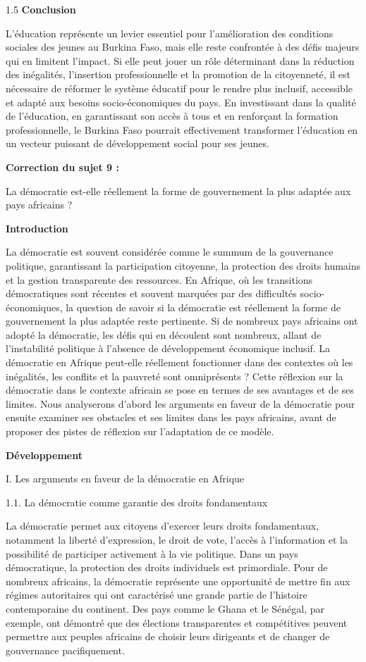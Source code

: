 \documentclass[12pt]{article}
\begin{document}
\begin{spacing}{1.5}
\textbf{Conclusion}

L'éducation représente un levier essentiel pour l'amélioration des conditions sociales des jeunes au Burkina Faso, mais elle reste confrontée à des défis majeurs qui en limitent l'impact. Si elle peut jouer un rôle déterminant dans la réduction des inégalités, l'insertion professionnelle et la promotion de la citoyenneté, il est nécessaire de réformer le système éducatif pour le rendre plus inclusif, accessible et adapté aux besoins socio-économiques du pays. En investissant dans la qualité de l'éducation, en garantissant son accès à tous et en renforçant la formation professionnelle, le Burkina Faso pourrait effectivement transformer l'éducation en un vecteur puissant de développement social pour ses jeunes.



\quad
\quad

\textbf{Correction du sujet 9 :}

 La démocratie est-elle réellement la forme de gouvernement la plus adaptée aux pays africains ?

\textbf{Introduction
}

La démocratie est souvent considérée comme le summum de la gouvernance politique, garantissant la participation citoyenne, la protection des droits humains et la gestion transparente des ressources. En Afrique, où les transitions démocratiques sont récentes et souvent marquées par des difficultés socio-économiques, la question de savoir si la démocratie est réellement la forme de gouvernement la plus adaptée reste pertinente. Si de nombreux pays africains ont adopté la démocratie, les défis qui en découlent sont nombreux, allant de l'instabilité politique à l'absence de développement économique inclusif. La démocratie en Afrique peut-elle réellement fonctionner dans des contextes où les inégalités, les conflits et la pauvreté sont omniprésents ? Cette réflexion sur la démocratie dans le contexte africain se pose en termes de ses avantages et de ses limites. Nous analyserons d'abord les arguments en faveur de la démocratie pour ensuite examiner ses obstacles et ses limites dans les pays africains, avant de proposer des pistes de réflexion sur l'adaptation de ce modèle.


\textbf{Développement}

I. Les arguments en faveur de la démocratie en Afrique

1.1. La démocratie comme garantie des droits fondamentaux
  
La démocratie permet aux citoyens d'exercer leurs droits fondamentaux, notamment la liberté d'expression, le droit de vote, l'accès à l'information et la possibilité de participer activement à la vie politique. Dans un pays démocratique, la protection des droits individuels est primordiale. Pour de nombreux africains, la démocratie représente une opportunité de mettre fin aux régimes autoritaires qui ont caractérisé une grande partie de l'histoire contemporaine du continent. Des pays comme le Ghana et le Sénégal, par exemple, ont démontré que des élections transparentes et compétitives peuvent permettre aux peuples africains de choisir leurs dirigeants et de changer de gouvernance pacifiquement.


\end{spacing}
\end{document}
